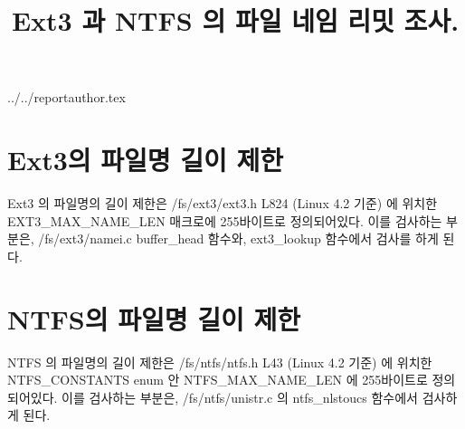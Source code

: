 \documentclass {article}
\begin{document}
\title {Ext3 과 NTFS 의 파일 네임 리밋 조사.}
 {../../reportauthor.tex}
\maketitle

\section{Ext3의 파일명 길이 제한}
Ext3 의 파일명의 길이 제한은 /fs/ext3/ext3.h L824 (Linux 4.2 기준) 에 위치한 EXT3\_MAX\_NAME\_LEN 매크로에 255바이트로 정의되어있다. 이를 검사하는 부분은, /fs/ext3/namei.c buffer\_head 함수와, ext3\_lookup 함수에서 검사를 하게 된다.

\section{NTFS의 파일명 길이 제한}
NTFS 의 파일명의 길이 제한은 /fs/ntfs/ntfs.h L43 (Linux 4.2 기준) 에 위치한 NTFS\_CONSTANTS enum 안 NTFS\_MAX\_NAME\_LEN 에 255바이트로 정의되어있다. 이를 검사하는 부분은, /fs/ntfs/unistr.c 의 ntfs\_nlstoucs 함수에서 검사하게 된다.
\end{document}
